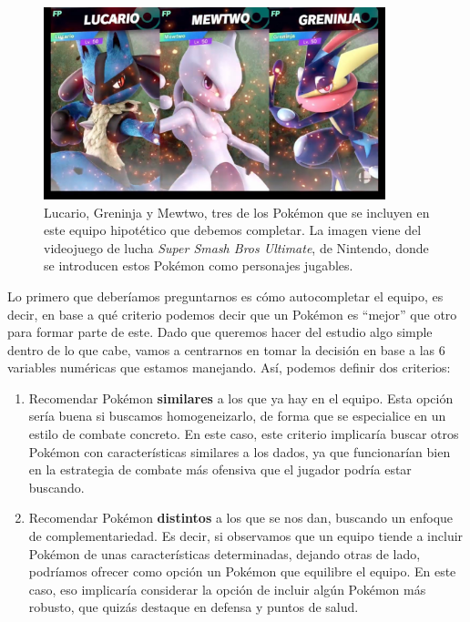 \documentclass[
  11.8pt,
]{extreport}
\begin{document}
\begin{figure}[H]

{\centering \includegraphics[width=3.90625in,height=\textheight]{trabajo_images/lucario_gren_mewtwo.jpg}

}

\caption{Lucario, Greninja y Mewtwo, tres de los Pokémon que se incluyen
en este equipo hipotético que debemos completar. La imagen viene del
videojuego de lucha \emph{Super Smash Bros Ultimate}, de Nintendo, donde
se introducen estos Pokémon como personajes jugables.}

\end{figure}%

Lo primero que deberíamos preguntarnos es cómo autocompletar el equipo,
es decir, en base a qué criterio podemos decir que un Pokémon es
``mejor'' que otro para formar parte de este. Dado que queremos hacer
del estudio algo simple dentro de lo que cabe, vamos a centrarnos en
tomar la decisión en base a las 6 variables numéricas que estamos
manejando. Así, podemos definir dos criterios:

\begin{enumerate}
\def\labelenumi{\arabic{enumi}.}
\item
  Recomendar Pokémon \textbf{similares} a los que ya hay en el equipo.
  Esta opción sería buena si buscamos homogeneizarlo, de forma que se
  especialice en un estilo de combate concreto. En este caso, este
  criterio implicaría buscar otros Pokémon con características similares
  a los dados, ya que funcionarían bien en la estrategia de combate más
  ofensiva que el jugador podría estar buscando.
\item
  Recomendar Pokémon \textbf{distintos} a los que se nos dan, buscando
  un enfoque de complementariedad. Es decir, si observamos que un equipo
  tiende a incluir Pokémon de unas características determinadas, dejando
  otras de lado, podríamos ofrecer como opción un Pokémon que equilibre
  el equipo. En este caso, eso implicaría considerar la opción de
  incluir algún Pokémon más robusto, que quizás destaque en defensa y
  puntos de salud.
\end{enumerate}
\end{document}
